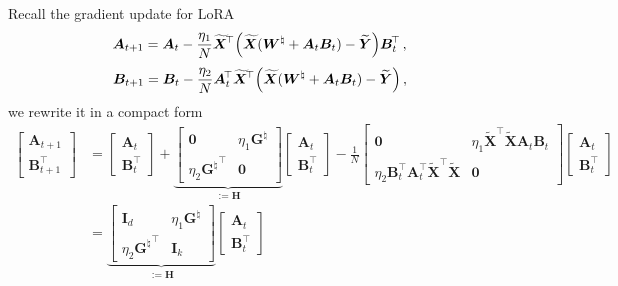 Recall the gradient update for LoRA
\begin{equation*}
    \bm A_{t+1} = \bm A_{t}-\frac{\eta_1}{N} \widetilde{\bm X}^{\!\top} \Bigl(\widetilde{\bm X} (\bm W^\natural+\bm A_t \bm B_t) - \widetilde{\bm Y}\Bigr) \bm B^{\!\top}_t\, ,
\end{equation*}
\begin{equation*}
    \bm B_{t+1} = \bm B_t -\frac{\eta_2}{N} \bm A^{\!\top}_t \widetilde{\bm X}^{\!\top} \Bigl(\widetilde{\bm X} (\bm W^\natural+\bm A_t \bm B_t) - \widetilde{\bm Y}\Bigr)\,,
\end{equation*}
we rewrite it in a compact form
\begin{equation}\label{eq:dynamics}
    \begin{split}
    \begin{bmatrix}
        \bm A_{t+1} \\ \bm B_{t+1}^{\!\top}
    \end{bmatrix} & = \begin{bmatrix}
        \bm A_t \\ \bm B_t^{\!\top}
    \end{bmatrix} + \underbrace{\begin{bmatrix}
        \bm 0 & \eta_1 {\bm G}^{\natural}\\
        \eta_2 {{\bm G}^{\natural}}^{\!\top} & \bm 0
    \end{bmatrix}}_{:=\bm H} \begin{bmatrix}
        \bm A_t \\ \bm B_t^{\!\top}
    \end{bmatrix} - \frac{1}{N} \begin{bmatrix}
        \bm 0 & \eta_1 \widetilde{\bm X}^{\!\top}\widetilde{\bm X}\bm A_t \bm B_t\\
        \eta_2 \bm B_t^{\!\top} \bm A_t^{\!\top}\widetilde{\bm X}^{\!\top}\widetilde{\bm X} & \bm 0
    \end{bmatrix}\begin{bmatrix}
        \bm A_t \\ \bm B_t^{\!\top}
    \end{bmatrix}\\
    & = \underbrace{\begin{bmatrix}
        \bm I_d & \eta_1 {\bm G}^{\natural}\\
        \eta_2 {{\bm G}^{\natural}}^{\!\top} & \bm I_k
    \end{bmatrix}}_{:=\bm H} \begin{bmatrix}
        \bm A_t \\ \bm B_t^{\!\top}

\end{bmatrix}
\end{split}
\end{equation}
